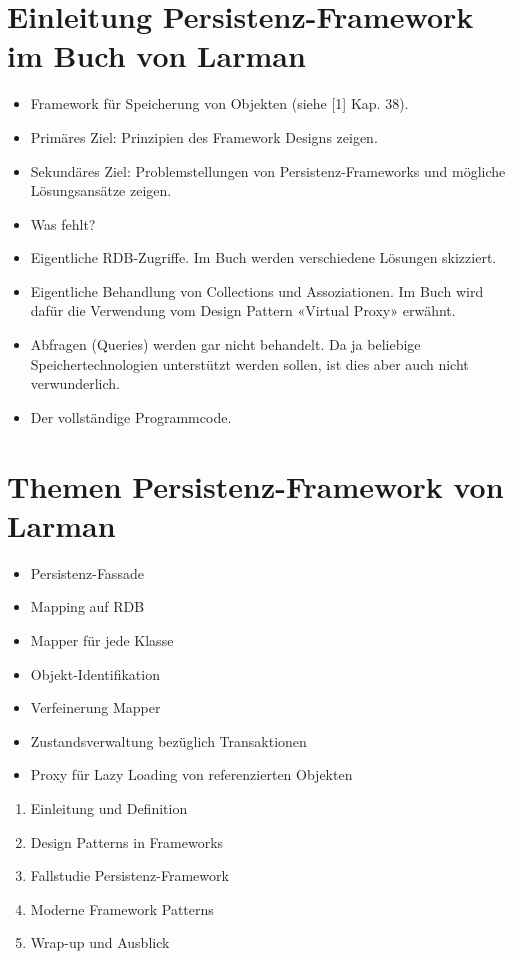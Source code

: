 \documentclass[10pt]{article}
\begin{document}
\section*{Einleitung Persistenz-Framework im Buch von Larman}
\begin{itemize}
  \item Framework für Speicherung von Objekten (siehe [1] Kap. 38).
  \item Primäres Ziel: Prinzipien des Framework Designs zeigen.
  \item Sekundäres Ziel: Problemstellungen von Persistenz-Frameworks und mögliche Lösungsansätze zeigen.
  \item Was fehlt?
  \item Eigentliche RDB-Zugriffe. Im Buch werden verschiedene Lösungen skizziert.
  \item Eigentliche Behandlung von Collections und Assoziationen. Im Buch wird dafür die Verwendung vom Design Pattern «Virtual Proxy» erwähnt.
  \item Abfragen (Queries) werden gar nicht behandelt. Da ja beliebige Speichertechnologien unterstützt werden sollen, ist dies aber auch nicht verwunderlich.
  \item Der vollständige Programmcode.
\end{itemize}

\section*{Themen Persistenz-Framework von Larman}
\begin{itemize}
  \item Persistenz-Fassade
  \item Mapping auf RDB
  \item Mapper für jede Klasse
  \item Objekt-Identifikation
  \item Verfeinerung Mapper
  \item Zustandsverwaltung bezüglich Transaktionen
  \item Proxy für Lazy Loading von referenzierten Objekten
\end{itemize}

\begin{enumerate}
  \item Einleitung und Definition
  \item Design Patterns in Frameworks
  \item Fallstudie Persistenz-Framework
  \item Moderne Framework Patterns
  \item Wrap-up und Ausblick
\end{enumerate}
\end{document}
